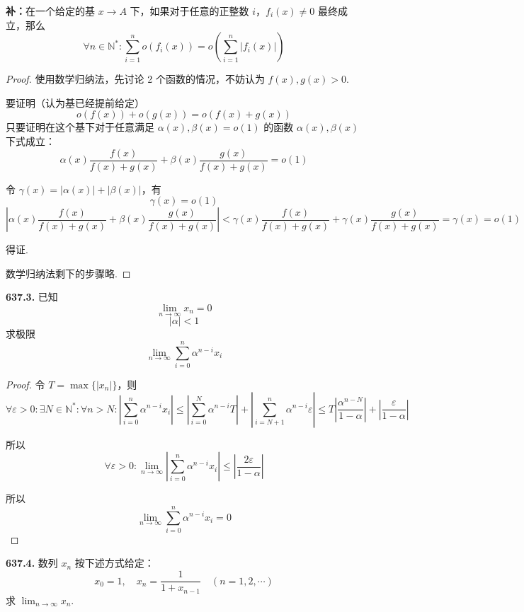 \textbf{补：}在一个给定的基 $x \rightarrow A$ 下，如果对于任意的正整数 $i$，$f_i(x) \neq 0$ 最终成立，那么
\[\forall n \in \mathbb{N}^*: \sum_{i=1}^{n} o(f_i(x)) = o\left(\sum_{i=1}^{n} \lvert f_i(x)\rvert\right)\]
\begin{proof}
    使用数学归纳法，先讨论 2 个函数的情况，不妨认为 $f(x), g(x) > 0$.
    
    要证明（认为基已经提前给定）
    \[o(f(x)) + o(g(x)) = o(f(x) + g(x))\]
    只要证明在这个基下对于任意满足 $\alpha(x), \beta(x) = o(1)$ 的函数 $\alpha(x), \beta(x)$ 下式成立：
    \[\alpha(x) \frac{f(x)}{f(x) + g(x)} + \beta(x) \frac{g(x)}{f(x) + g(x)} = o(1)\]

    令 $\gamma(x) = \lvert\alpha(x)\rvert + \lvert\beta(x)\rvert$，有
    \[\gamma(x) = o(1)\]
    \[\left|\alpha(x) \frac{f(x)}{f(x) + g(x)} + \beta(x) \frac{g(x)}{f(x) + g(x)}\right| < \gamma(x) \frac{f(x)}{f(x) + g(x)} + \gamma(x) \frac{g(x)}{f(x) + g(x)} = \gamma(x) = o(1)\]
    
    得证.

    数学归纳法剩下的步骤略.
\end{proof}\vspace{9pt}

\textbf{637.3.} 已知
\[\lim_{n \rightarrow \infty} x_n = 0\]
\[\lvert \alpha\rvert < 1\]
求极限
\[\lim_{n \rightarrow \infty} \sum_{i=0}^{n} \alpha^{n-i} x_i\]

\begin{proof}
    令 $T = \max\{\lvert x_n\rvert\}$，则
    \[\forall \varepsilon > 0: \exists N \in \mathbb{N}^*: \forall n > N: \left| \sum_{i=0}^{n} \alpha^{n-i} x_i\right| \leqslant \left| \sum_{i=0}^{N} \alpha^{n-i}T\right| + \left| \sum_{i=N+1}^{n} \alpha^{n-i} \varepsilon \right| \leqslant T \left|\frac{\alpha^{n-N}}{1 - \alpha}\right| + \left|\frac{\varepsilon}{1 - \alpha}\right|\]

    所以
    \[\forall \varepsilon > 0: \lim_{n \rightarrow \infty} \left| \sum_{i=0}^{n} \alpha^{n-i} x_i\right| \leqslant \left| \frac{2\varepsilon}{1 - \alpha}\right|\]

    所以
    \[\lim_{n \rightarrow \infty} \sum_{i=0}^{n} \alpha^{n-i} x_i = 0\]
\end{proof}\vspace{9pt}

\textbf{637.4.} 数列 $x_n$ 按下述方式给定：
\[x_0 = 1, \quad x_n = \frac{1}{1 + x_{n-1}} \quad (n = 1,2,\cdots)\]
求 $\displaystyle \lim_{n \rightarrow \infty} x_n$.


